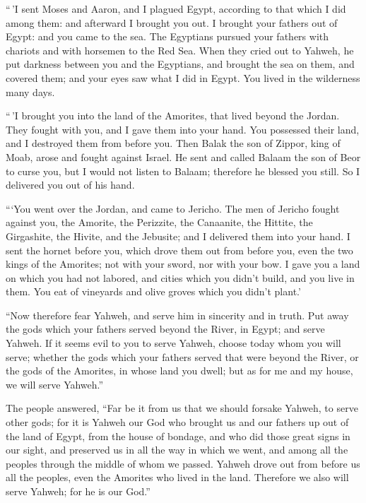  ``\,'I sent Moses and Aaron, and I plagued Egypt,
according to that which I did among them: and afterward I brought you
out.  I brought your fathers out of Egypt: and you came to
the sea. The Egyptians pursued your fathers with chariots and with
horsemen to the Red Sea.  When they cried out to Yahweh,
he put darkness between you and the Egyptians, and brought the sea on
them, and covered them; and your eyes saw what I did in Egypt. You lived
in the wilderness many days.

 ``\,'I brought you into the land of the Amorites, that
lived beyond the Jordan. They fought with you, and I gave them into your
hand. You possessed their land, and I destroyed them from before you.
 Then Balak the son of Zippor, king of Moab, arose and
fought against Israel. He sent and called Balaam the son of Beor to
curse you,  but I would not listen to Balaam; therefore
he blessed you still. So I delivered you out of his hand.

 ```You went over the Jordan, and came to Jericho. The
men of Jericho fought against you, the Amorite, the Perizzite, the
Canaanite, the Hittite, the Girgashite, the Hivite, and the Jebusite;
and I delivered them into your hand.  I sent the hornet
before you, which drove them out from before you, even the two kings of
the Amorites; not with your sword, nor with your bow.  I
gave you a land on which you had not labored, and cities which you
didn't build, and you live in them. You eat of vineyards and olive
groves which you didn't plant.'

 ``Now therefore fear Yahweh, and serve him in sincerity
and in truth. Put away the gods which your fathers served beyond the
River, in Egypt; and serve Yahweh.  If it seems evil to
you to serve Yahweh, choose today whom you will serve; whether the gods
which your fathers served that were beyond the River, or the gods of the
Amorites, in whose land you dwell; but as for me and my house, we will
serve Yahweh.''

 The people answered, ``Far be it from us that we should
forsake Yahweh, to serve other gods;  for it is Yahweh
our God who brought us and our fathers up out of the land of Egypt, from
the house of bondage, and who did those great signs in our sight, and
preserved us in all the way in which we went, and among all the peoples
through the middle of whom we passed.  Yahweh drove out
from before us all the peoples, even the Amorites who lived in the land.
Therefore we also will serve Yahweh; for he is our God.''

